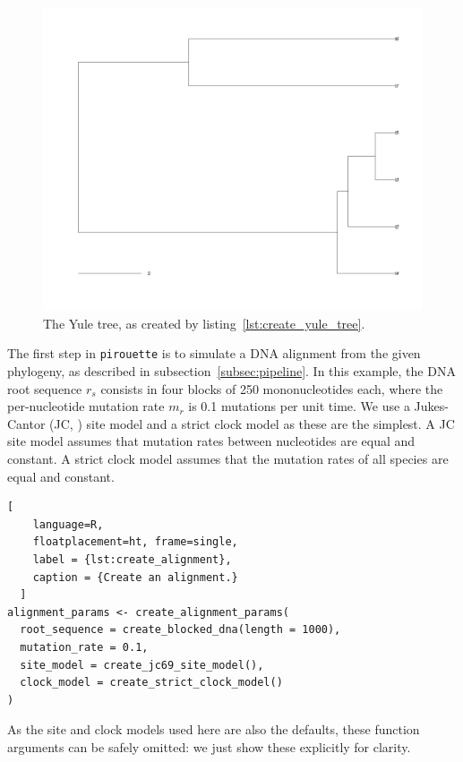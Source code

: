 \documentclass{article}
\begin{document}
\begin{figure}[ht]
  \includegraphics[width=\textwidth]{example_1/true_tree.png}
  \caption{The Yule tree, as created by listing~\ref{lst:create_yule_tree}.}
  \label{fig:yule_tree}
\end{figure}

The first step in \verb;pirouette; is to simulate a DNA alignment from the 
given phylogeny, as described in subsection~\ref{subsec:pipeline}.
In this example, the DNA root sequence $\mathit{r_{s}}$ 
consists in four blocks of 250 
mononucleotides each, 
where the per-nucleotide mutation rate $\mathit{m_{r}}$ 
is 0.1 mutations per unit time.
We use a Jukes-Cantor (JC, \cite{jukes1969evolution}) site model
and a strict clock model as these are the simplest.
A JC site model
assumes that mutation rates between nucleotides are equal and constant. 
A strict clock model assumes that the mutation rates 
of all species are equal and constant.

\begin{lstlisting}[
    language=R,
    floatplacement=ht, frame=single,
    label = {lst:create_alignment}, 
    caption = {Create an alignment.}
  ]
alignment_params <- create_alignment_params(
  root_sequence = create_blocked_dna(length = 1000),
  mutation_rate = 0.1,
  site_model = create_jc69_site_model(),
  clock_model = create_strict_clock_model()
)
\end{lstlisting}

As the site and clock models used here are also the defaults, 
these function arguments can be safely omitted: we just show these
explicitly for clarity.
\end{document}
